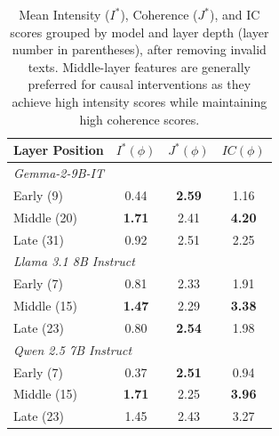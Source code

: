 \begin{table}[h]
\caption{Mean Intensity ($I^*$), Coherence ($J^*$), and IC scores grouped by model and layer depth (layer number in parentheses), after removing invalid texts. Middle-layer features are generally preferred for causal interventions as they achieve high intensity scores while maintaining high coherence scores.}
\label{tab:ic_scores_combined}
\vskip 0.15in
\begin{center}
\begin{small}
\begin{sc}
\begin{tabular}{lccc}
\toprule
Layer Position & $I^*(\phi)$ & $J^*(\phi)$ & $IC(\phi)$ \\
\midrule
\multicolumn{4}{l}{\textit{Gemma-2-9B-IT}} \\
\midrule
Early (9)  & 0.44 & \textbf{2.59} & 1.16 \\
Middle (20) & \textbf{1.71} & 2.41 & \textbf{4.20} \\
Late (31) & 0.92 & 2.51 & 2.25 \\
\midrule
\multicolumn{4}{l}{\textit{Llama 3.1 8B Instruct}} \\
\midrule
Early (7) & 0.81 & 2.33 & 1.91 \\
Middle (15) & \textbf{1.47} & 2.29 & \textbf{3.38} \\
Late (23) & 0.80 & \textbf{2.54} & 1.98 \\
\midrule
\multicolumn{4}{l}{\textit{Qwen 2.5 7B Instruct}} \\
\midrule
Early (7) & 0.37 & \textbf{2.51} & 0.94 \\
Middle (15) & \textbf{1.71} & 2.25 & \textbf{3.96} \\
Late (23) & 1.45 & 2.43 & 3.27 \\
\bottomrule
\end{tabular}
\end{sc}
\end{small}
\end{center}
\vskip -0.1in
\end{table}
